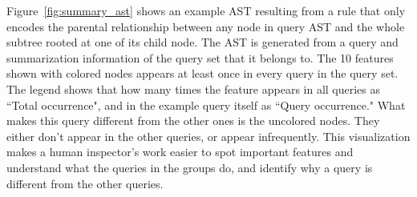 Figure~\ref{fig:summary_ast} shows an example AST resulting from a rule that only encodes the parental relationship between any node in query AST and the whole subtree rooted at one of its child node.
The AST is generated from a query and summarization information of the query set that it belongs to.
The 10 features shown with colored nodes appears at least once in every query in the query set. The legend shows that how many times the feature appears in all queries as ``Total occurrence", and in the example query itself as ``Query occurrence."
What makes this query different from the other ones is the uncolored nodes.
They either don't appear in the other queries, or appear infrequently.
This visualization makes a human inspector's work easier to spot important features and understand what the queries in the groups do, and identify why a query is different from the other queries.



